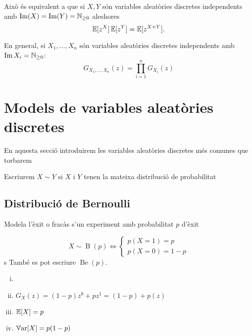 \begin{obs}
    Això \'es equivalent a que si $X, Y$ són variables aleatòries discretes independents
    amb $\operatorname{Im}(X) = \operatorname{Im}(Y) = \mathbb{N}_{\geq 0}$ aleshores
    \[
        \operatorname{\mathbb{E}}[z^X]\operatorname{\mathbb{E}}[z^Y] = \operatorname{\mathbb{E}}[z^{X+Y}].
    \]
\end{obs}

\begin{obs}
    En general, si $X_1, \dots, X_n$ són variables aleatòries discretes independents amb
    $\operatorname{Im} X_i = \mathbb{N}_{\geq 0}$:
    \[
        G_{X_1,\dots,X_n}(z) = \prod_{i = 1}^n G_{X_i}(z)
    \]
\end{obs}

\section{Models de variables aleatòries discretes}

En aquesta secció introduirem les variables aleatòries discretes més comunes que torbarem

\begin{obs}
    Escriurem $X \sim Y$ si $X$ i $Y$ tenen la mateixa distribució de probabilitat
\end{obs}

\subsection*{Distribució de Bernoulli}

Modela l'èxit o fracàs s'un experiment amb probabilitat $p$ d'èxit

\begin{defi}
    \[X \sim \operatorname{B}(p) \iff \begin{cases}
                       p(X=1) = p \\
                       p(X=0) = 1-p
                       \end{cases}
    \]s
    També es pot escriure $\operatorname{Be}(p)$.
\end{defi}

\begin{prop}
    \begin{enumerate}[i)]
        \item[]
        \item $G_X(z) = (1-p)z^0 + pz^1 = (1-p) + p(z)$
        \item $\operatorname{\mathbb{E}}[X] = p$
        \item $\operatorname{\mathbb{V}ar}[X] = p(1-p)$
    \end{enumerate}
\end{prop}

